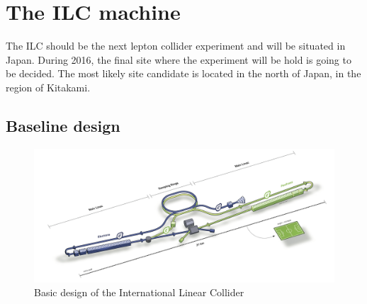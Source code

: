 
  \section{The ILC machine}
  
    The ILC should be the next lepton collider experiment and will be situated in Japan.
    During 2016, the final site where the experiment will be hold is going to be decided.
    The most likely site candidate is located in the north of Japan, in the region of Kitakami. 
    
    \subsection{Baseline design}

   \begin{figure}
      \centering
      \includegraphics[width = 15 cm]{Pictures/ILC}
      \caption{Basic design of the International Linear Collider}
      \label{fig:ILC}
    \end{figure}


